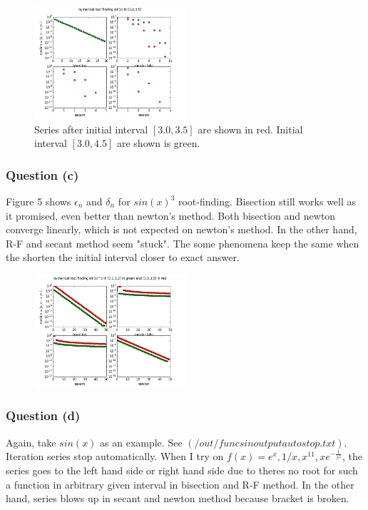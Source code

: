 \documentclass[12pt]{article}
\begin{document}
\begin{figure}[h]
	\begin{center}
		\includegraphics[width=0.5\textwidth]{figure_1.png}
		\caption{Series after initial interval $[3.0,3.5]$ are shown in red. Initial interval $[3.0,4.5]$ are shown is green.}
		\label{fig4}
		
	\end{center}
\end{figure}

\subsubsection{Question (c)}
	Figure 5 shows $\epsilon_{n}$ and $\delta_{n}$ for $sin(x)^{3}$ root-finding. Bisection still works well as it promised, even better than newton's method. Both bisection and newton converge linearly, which is not expected on newton's method. In the other hand, R-F and secant method seem "stuck". The some phenomena keep the same when the shorten the initial interval closer to exact answer. 
\begin{figure}[h]
\begin{center}
	\includegraphics[width=0.5\textwidth]{eps_sin_tri_1.png}
	\caption{}
	\label{fig5}
\end{center}
\end{figure}

\subsubsection{Question (d)}
Again, take $sin(x)$ as an example. See $(/out/func sin output autostop.txt)$. Iteration series stop automatically. When I try on $f(x)=e^{x},1/x,x^{11},xe^{-\frac{1}{x^{2}}}$, the series goes to the left hand side or right hand side due to theres no root for such a function in arbitrary given interval in bisection and R-F method. In the other hand, series blows up in secant and newton method because bracket is broken.
\end{document}
